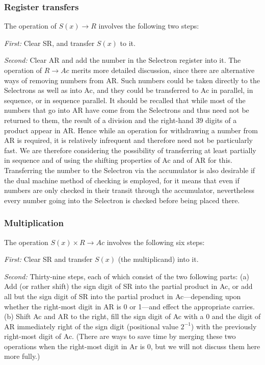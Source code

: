 \documentclass[12pt]{amsart}
\begin{document}
\subsubsection{Register transfers}
The operation of $S(x) \rightarrow R$ involves the following two steps:

\emph{First:} Clear SR, and transfer $S(x)$ to it.

\emph{Second:} Clear AR and add the number in the Selectron register into it. The operation of $R \rightarrow Ac$ merits more detailed discussion, since there are alternative ways of removing numbers from AR. Such numbers could be taken directly to the Selectrons as well as into Ac, and they could be transferred to Ac in parallel, in sequence, or in sequence parallel. It should be recalled that while most of the numbers that go into AR have come from the Selectrons and thus need not be returned to them, the result of a division and the right-hand 39 digits of a product appear in AR. Hence while an operation for withdrawing a number from AR is required, it is relatively infrequent and therefore need not be particularly fast. We are therefore considering the possibility of transferring at least partially in sequence and of using the shifting properties of Ac and of AR for this. Transferring the number to the Selectron via the accumulator is also desirable if the dual machine method of checking is employed, for it means that even if numbers are only checked in their transit through the accumulator, nevertheless every number going into the Selectron is checked before being placed there.

\subsubsection{Multiplication}
The operation $S(x) \times R \rightarrow Ac$ involves the following six steps:

\emph{First:} Clear SR and transfer $S(x)$ (the multiplicand) into it.

\emph{Second:} Thirty-nine steps, each of which consist of the two following parts: (a) Add (or rather shift) the sign digit of SR into the partial product in Ac, or add all but the sign digit of SR into the partial product in Ac---depending upon whether the right-most digit in AR is 0 or 1---and effect the appropriate carries. (b) Shift Ac and AR to the right, fill the sign digit of Ac with a 0 and the digit of AR immediately right of the sign digit (positional value $2^{-1}$) with the previously right-most digit of Ac. (There are ways to save time by merging these two operations when the right-most digit in Ar is 0, but we will not discuss them here more fully.)
\end{document}
